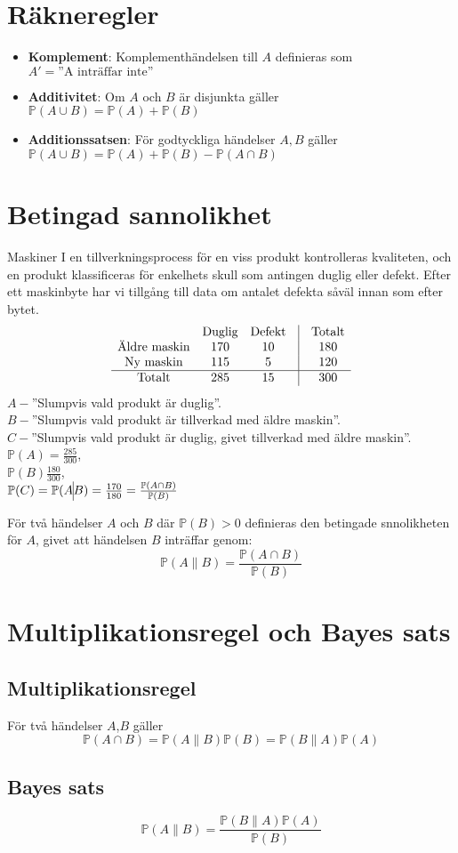 \section{Räkneregler}
\begin{itemize}
	\item \textbf{Komplement}: Komplementhändelsen till $A$ definieras som $A'=\text{''A inträffar inte''}$
	\item \textbf{Additivitet}: Om $A$ och $B$ är disjunkta gäller $\mathbb{P}(A\cup B) =\mathbb{P}(A)+\mathbb{P}(B)$
	\item \textbf{Additionssatsen}: För godtyckliga händelser $A,B$ gäller $\mathbb{P}(A\cup B)=\mathbb{P}(A)+\mathbb{P}(B)-\mathbb{P}(A\cap B)$
\end{itemize}

\section{Betingad sannolikhet}
\begin{exempel}{Maskiner}
	I en tillverkningsprocess för en viss produkt kontrolleras kvaliteten, och en produkt klassificeras för enkelhets skull som antingen duglig eller defekt. Efter ett maskinbyte har vi tillgång till data om antalet defekta såväl innan som efter bytet.
	$$
		\begin{matrix}
			~                   & \text{Duglig} & \text{Defekt} & \vline & \text{Totalt} \\
			\text{Äldre maskin} & 170           & 10            & \vline & 180           \\
			\text{Ny maskin}    & 115           & 5             & \vline & 120           \\
			\hline
			\text{Totalt}       & 285           & 15            & \vline & 300
		\end{matrix}
	$$
	$A-$''Slumpvis vald produkt är duglig''.\\
	$B-$''Slumpvis vald produkt är tillverkad med äldre maskin''.\\
	$C-$''Slumpvis vald produkt är duglig, givet tillverkad med äldre maskin''.\\
	$\mathbb{P}(A)=\frac{285}{300}$,\\ $\mathbb{P}(B)\frac{180}{300}$,\\ $\mathbb{P}(C)=\mathbb{P}(A\vline B)=\frac{170}{180}=\frac{\mathbb{P}(A\cap B)}{\mathbb{P}(B)}$
\end{exempel}
För två händelser $A$ och $B$ där $\mathbb{P}(B)>0$ definieras den betingade snnolikheten för $A$, givet att händelsen $B$ inträffar genom:$$
	\mathbb{P}(A\|B)=\frac{\mathbb{P}(A\cap B)}{\mathbb{P}(B)}
$$
\section{Multiplikationsregel och Bayes sats}
\subsection{Multiplikationsregel}
För två händelser $A$,$B$ gäller$$
	\mathbb{P}(A\cap B)=\mathbb{P}(A\|B)\mathbb{P}(B)=\mathbb{P}(B\|A)\mathbb{P}(A)
$$
\subsection{Bayes sats}
$$
	\mathbb{P}(A\|B)=\frac{\mathbb{P}(B\|A)\mathbb{P}(A)}{\mathbb{P}(B)}
$$
